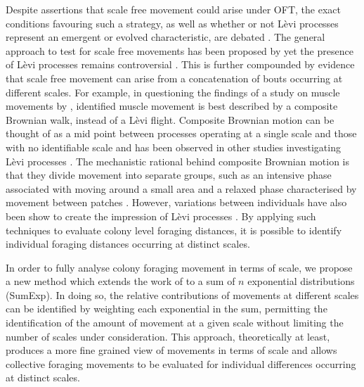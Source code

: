 \documentclass[11pt,usenames,dvipsnames]{article}
\begin{document}
Despite assertions that scale free movement could arise under OFT, the exact conditions favouring such a strategy, as well as whether or not L\`evi processes represent an emergent or evolved characteristic, are debated \citep{Wosniack2017, Pyke2015, Kolzsch2015, DeJager2013}. The general approach to test for scale free movements has been proposed by \cite{Murphy2007} yet the presence of L\`evi processes remains controversial \citep{Pyke2015}. This is further compounded by evidence that scale free movement can arise from a concatenation of bouts occurring at different scales. For example, in questioning the findings of a study on muscle movements by \cite{DeJager2011}, \cite{Jansen2012} identified muscle movement is best described by a composite Brownian walk, instead of a L\`evi flight. Composite Brownian motion can be thought of as a mid point between processes operating at a single scale and those with no identifiable scale and has been observed in other studies investigating L\`evi processes \citep{Petrovskii2011, Sakamoto2017, Gautestad2012, Zhao2016}. The mechanistic rational behind composite Brownian motion is that they divide movement into separate groups, such as an intensive phase associated with moving around a small area and a relaxed phase characterised by movement between patches \citep{Auger-Methe2015}. However, variations between individuals have also been show to create the impression of L\`evi processes \citep{Petrovskii2011}. By applying such techniques to evaluate colony level foraging distances, it is possible to identify individual foraging distances occurring at distinct scales.

In order to fully analyse colony foraging movement in terms of scale, we propose a new method which extends the work of \cite{Petrovskii2011} to a sum of $n$ exponential distributions (SumExp). In doing so, the relative contributions of movements at different scales can be identified by weighting each exponential in the sum, permitting the identification of the amount of movement at a given scale without limiting the number of scales under consideration. This approach, theoretically at least, produces a more fine grained view of movements in terms of scale and allows collective foraging movements to be evaluated for individual differences occurring at distinct scales.
\end{document}

